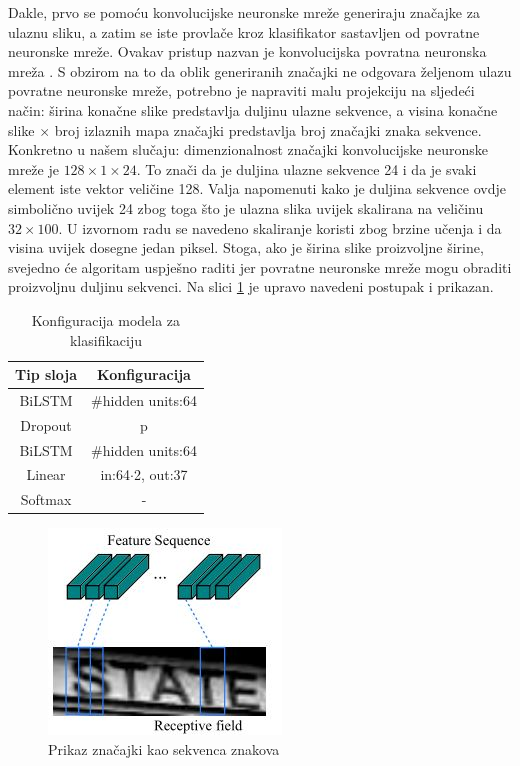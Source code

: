 \documentclass[times, utf8, diplomski]{fer}
\begin{document}
Dakle, prvo se pomoću konvolucijske neuronske mreže generiraju značajke za ulaznu sliku, a zatim se iste provlače kroz klasifikator sastavljen od povratne neuronske mreže. Ovakav pristup nazvan je konvolucijska povratna neuronska mreža . S obzirom na to da oblik generiranih značajki ne odgovara željenom ulazu povratne neuronske mreže, potrebno je napraviti malu projekciju na sljedeći način: širina konačne slike predstavlja duljinu ulazne sekvence, a visina konačne slike $\times$ broj izlaznih mapa značajki predstavlja broj značajki znaka sekvence. Konkretno u našem slučaju: dimenzionalnost značajki konvolucijske neuronske mreže je $128\times1\times24$. To znači da je duljina ulazne sekvence 24 i da je svaki element iste vektor veličine 128. Valja napomenuti kako je duljina sekvence ovdje simbolično uvijek 24 zbog toga što je ulazna slika uvijek skalirana na veličinu $32\times100$. U izvornom radu \citep{crnn-paper} se navedeno skaliranje koristi zbog brzine učenja i da visina uvijek dosegne jedan piksel. Stoga, ako je širina slike proizvoljne širine, svejedno će algoritam uspješno raditi jer povratne neuronske mreže mogu obraditi proizvoljnu duljinu sekvenci. Na slici \ref{fig:crnn-features} je upravo navedeni postupak i prikazan.

\bigskip

\begin{table}[H]
    \centering
    \begin{tabular}{|c|c|}
        \hline
        Tip sloja & Konfiguracija \\
        \hline \hline
        BiLSTM & \#hidden units:64\\
        \hline
        Dropout & p \\
        \hline
        BiLSTM & \#hidden units:64 \\
        \hline
        Linear & in:64$\cdot$2, out:37 \\
        \hline
        Softmax & - \\
        \hline
    \end{tabular}
    \caption{Konfiguracija modela za klasifikaciju}
    \label{tab:recognizer}
\end{table}

\begin{figure}[H]
    \centering
    \includegraphics[scale=0.7]{figures/recognizer/crnn-features.jpg}
    \caption[Caption for LOF]{Prikaz značajki kao sekvenca znakova\footnotemark}
    \label{fig:crnn-features}
\end{figure}
\end{document}

